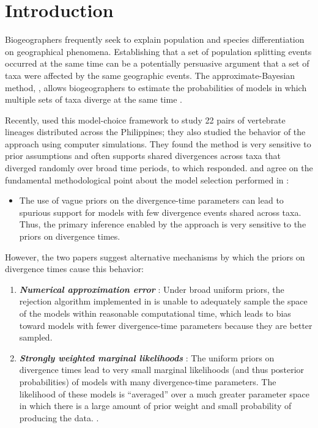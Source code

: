 \section{Introduction}
Biogeographers frequently seek to explain population and species
differentiation on geographical phenomena.
Establishing that a set of population splitting events occurred
at the same time can be a potentially persuasive argument that a set of taxa
were affected by the same geographic events.
The approximate-Bayesian method, \msb, allows biogeographers to estimate the
probabilities of models in which multiple sets of taxa diverge at the same
time \citep{Hickerson2006,Huang2011}.

Recently, \citet{Oaks2012} used this model-choice framework to study 22 pairs
of vertebrate lineages distributed across the Philippines; they also studied
the behavior of the \msb approach using computer simulations.
They found the method is very sensitive to prior assumptions and often
supports shared divergences across taxa that diverged randomly over broad time
periods, to which \citet{Hickerson2013} responded.
\citet{Oaks2012} and \citet{Hickerson2013} agree on the fundamental
methodological point about the model selection performed in \msb:
\begin{itemize}
   \item The use of vague priors on the divergence-time parameters can lead to
       spurious support for models with few divergence events shared across
       taxa. Thus, the primary inference enabled by the approach is very
       sensitive to the priors on divergence times.
\end{itemize}
However, the two papers suggest alternative mechanisms by which the priors on
divergence times cause this behavior:
\begin{enumerate}[label=\textsl{\textbf{Hypothesis \arabic*)}},ref=\arabic*,align=left]
    \item \textsl{\textbf{Numerical approximation error}} \citep{Hickerson2013}:
        Under broad uniform priors, the rejection algorithm implemented in \msb
        is unable to adequately sample the space of the models within
        reasonable computational time, which leads to bias toward models with
        fewer divergence-time parameters because they are better sampled.
        \label{hypError}
    \item \textsl{\textbf{Strongly weighted marginal likelihoods}}
        \citep{Oaks2012}:
        The uniform priors on divergence times lead to very small marginal
        likelihoods (and thus posterior probabilities) of models with many
        divergence-time parameters.  The likelihood of these models is
        ``averaged'' over a much greater parameter space in which there is a
        large amount of prior weight and small probability of producing the
        data.  \citep{Jeffreys1939,Lindley1957}. \label{hypML}
\end{enumerate}
